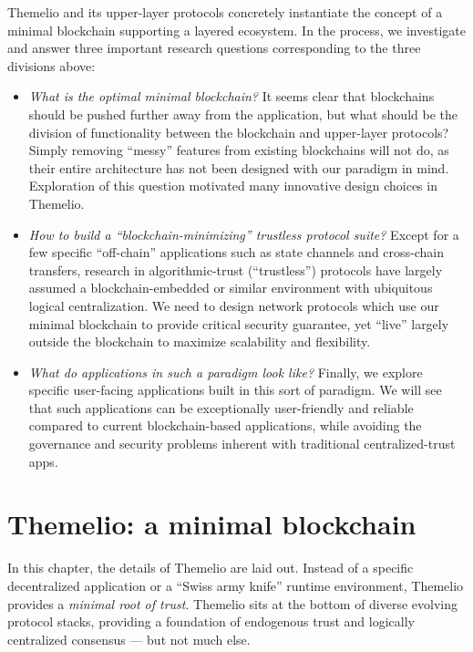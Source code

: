 \documentclass[headinclude,12pt]{scrbook}
\begin{document}
Themelio and its upper-layer protocols concretely instantiate the concept of a minimal blockchain supporting a layered ecosystem. In the process, we investigate and answer three important research questions corresponding to the three divisions above:

\begin{itemize}
    \item \textit{What is the optimal minimal blockchain?} It seems clear that blockchains should be pushed further away from the application, but what should be the division of functionality between the blockchain and upper-layer protocols? Simply removing ``messy'' features from existing blockchains will not do, as their entire architecture has not been designed with our paradigm in mind. Exploration of this question motivated many innovative design choices in Themelio.
    \item \textit{How to build a ``blockchain-minimizing'' trustless protocol suite?} Except for a few specific ``off-chain'' applications such as state channels and cross-chain transfers, research in algorithmic-trust (``trustless'') protocols have largely assumed a blockchain-embedded or similar environment with ubiquitous logical centralization. We need to design network protocols which use our minimal blockchain to provide critical security guarantee, yet ``live'' largely outside the blockchain to maximize scalability and flexibility.
    \item \textit{What do applications in such a paradigm look like?} Finally, we explore specific user-facing applications built in this sort of paradigm. We will see that such applications can be exceptionally user-friendly and reliable compared to current blockchain-based applications, while avoiding the governance and security problems inherent with traditional centralized-trust apps.
\end{itemize}


\chapter{Themelio: a minimal blockchain}

In this chapter, the details of Themelio are laid out. Instead of a specific decentralized application or a ``Swiss army knife'' runtime environment, Themelio provides a \emph{minimal root of trust}. Themelio sits at the bottom of diverse evolving protocol stacks, providing a foundation of endogenous trust and logically centralized consensus --- but not much else.
\end{document}
